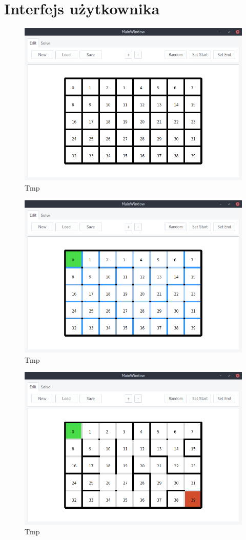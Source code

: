 \documentclass[12pt,a4paper]{article}
\begin{document}
	\section{Interfejs użytkownika}
	
	\begin{figure}[H]
		\centering
		\includegraphics[width=0.8\linewidth]{obrazki/1.png}
		\caption{Tmp}
	\end{figure}
	
	\begin{figure}[H]
		\centering
		\includegraphics[width=0.8\linewidth]{obrazki/2.png}
		\caption{Tmp}
	\end{figure}
	
	\begin{figure}[H]
		\centering
		\includegraphics[width=0.8\linewidth]{obrazki/4.png}
		\caption{Tmp}
	\end{figure}
	
\end{document}
